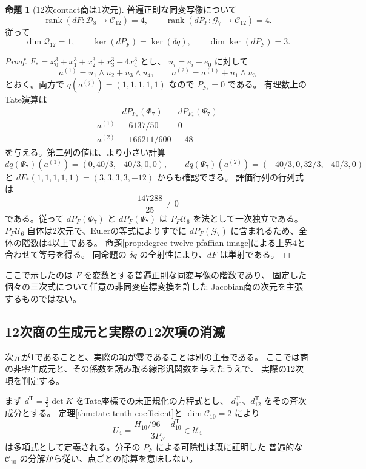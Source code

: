 \documentclass[a4paper,11pt]{ltjsarticle}
\theoremstyle{definition}
\newtheorem{proposition}[theorem]{命題}
\begin{document}
\begin{proposition}[12次contact商は1次元]
\label{prop:v10-contact-exact-rank}
普遍正則な同変写像について
\[
 \operatorname{rank}(dF\colon\mathcal D_8\to\mathcal C_{12})=4,
 \qquad
 \operatorname{rank}(dP_F\colon\mathcal G_7\to\mathcal C_{12})=4.
\]
従って
\[
 \dim\mathcal Q_{12}=1,\qquad
 \ker(dP_F)=\ker(\delta q),\qquad\dim\ker(dP_F)=3.
\]
\end{proposition}
\begin{proof}
$F_*=x_0^3+x_1^3+x_2^3+x_3^3-4x_4^3$ とし、
$u_i=e_i-e_0$ に対して
\[
 a^{(1)}=u_1\wedge u_2+u_3\wedge u_4,
 \qquad a^{(2)}=a^{(1)}+u_1\wedge u_3
\]
とおく。両方で $q(a^{(j)})=(1,1,1,1,1)$ なので $P_{F_*}=0$ である。
有理数上のTate演算は
\[
\begin{array}{c|cc}
 &dP_{F_*}(\Phi_7)&dP_{F_*}(\Psi_7)\\\hline
 a^{(1)}&-6137/50&0\\
 a^{(2)}&-166211/600&-48
\end{array}
\]
を与える。第二列の値は、より小さい計算
\[
 dq(\Psi_7)(a^{(1)})=(0,40/3,-40/3,0,0),
 \qquad
 dq(\Psi_7)(a^{(2)})=(-40/3,0,32/3,-40/3,0)
\]
と $dF_*(1,1,1,1,1)=(3,3,3,3,-12)$ からも確認できる。
評価行列の行列式は
\[
 \frac{147288}{25}\ne0
\]
である。従って $dP_F(\Phi_7)$ と $dP_F(\Psi_7)$ は
$P_F\mathcal U_6$ を法として一次独立である。
$P_F\mathcal U_6$ 自体は2次元で、Eulerの等式によりすでに
$dP_F(\mathcal G_7)$ に含まれるため、全体の階数は4以上である。
命題\ref{prop:degree-twelve-pfaffian-image}による上界4と合わせて等号を得る。
同命題の $\delta q$ の全射性により、$dF$ は単射である。
\end{proof}

ここで示したのは $F$ を変数とする普遍正則な同変写像の階数であり、
固定した個々の三次式について任意の非同変座標変換を許した
Jacobian商の次元を主張するものではない。


\subsection{12次商の生成元と実際の12次項の消滅}
\label{subsec:v10-actual-twelfth-class}

次元が1であることと、実際の項が零であることは別の主張である。
ここでは商の非零生成元と、その係数を読み取る線形汎関数を与えたうえで、
実際の12次項を判定する。

まず $d^{\mathrm T}=\tfrac12\det K$ をTate座標での未正規化の方程式とし、
$d^{\mathrm T}_{10}$、$d^{\mathrm T}_{12}$ をその斉次成分とする。
定理\ref{thm:tate-tenth-coefficient}と $\dim\mathcal C_{10}=2$ により
\begin{equation}\label{eq:v10-normalized-U4}
 U_4=\frac{H_{10}/96-d^{\mathrm T}_{10}}{3P_F}
       \in\mathcal U_4
\end{equation}
は多項式として定義される。分子の $P_F$ による可除性は既に証明した
普遍的な $\mathcal C_{10}$ の分解から従い、点ごとの除算を意味しない。
\end{document}
